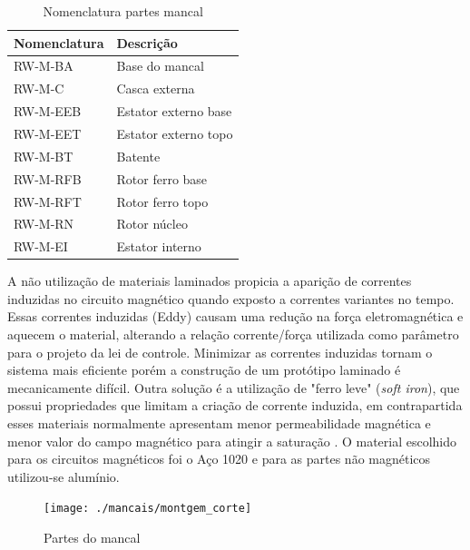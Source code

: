  \begin{table}
 \centering
	  \begin{tabular}{l l}
	  	 Nomenclatura & Descrição  \\ \hline
		  RW-M-BA 		&	Base do mancal \\
		  RW-M-C   		 &	Casca externa\\
		  RW-M-EEB	  & Estator externo base\\
		  RW-M-EET & 	Estator externo topo\\
		  RW-M-BT & 	Batente\\
		  RW-M-RFB & 	Rotor ferro base\\
		  RW-M-RFT	&  Rotor ferro topo\\
		  RW-M-RN & 	Rotor núcleo\\
		  RW-M-EI	&  Estator interno\\
	  \end{tabular} 
	  \caption{Nomenclatura partes mancal}
	  \label{Tab:nomenclatura:mancal} 
 \end{table}
 
 A não utilização de materiais laminados propicia  a aparição de correntes induzidas  no circuito magnético quando exposto a correntes variantes no tempo. Essas correntes induzidas (Eddy) causam uma redução na força eletromagnética e aquecem o material, alterando a relação corrente/força utilizada como parâmetro para o projeto da lei de controle. Minimizar as correntes induzidas tornam o sistema mais eficiente porém a construção de um protótipo laminado é mecanicamente difícil. Outra solução é a utilização de "ferro leve" (\textit{soft iron}), que possui propriedades que limitam a criação de corrente induzida, em contrapartida esses materiais normalmente apresentam menor permeabilidade magnética e menor valor do campo magnético para atingir a saturação \citep{Han2013a}. O material escolhido para os circuitos magnéticos foi o Aço 1020 e para as partes não magnéticos utilizou-se alumínio.
  
\begin{figure}[th!]
\centering
\texttt{[image: ./mancais/montgem\_corte]}
\caption{Partes do mancal}
\label{fig:montgem:corte}
\end{figure}
